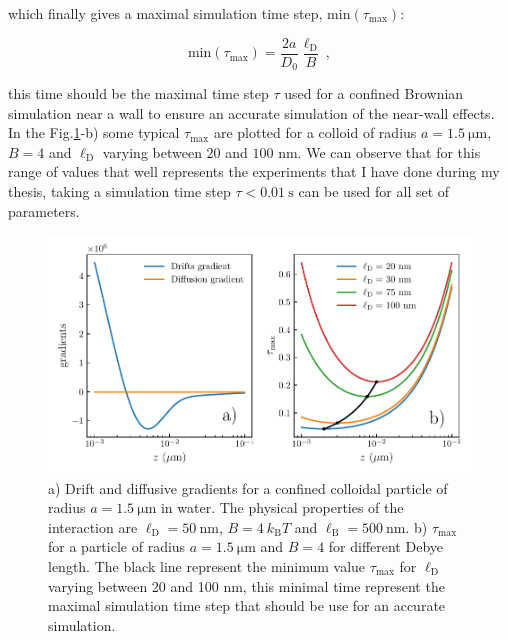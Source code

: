 which finally gives a maximal simulation time step, $\mathrm{min}(\tau_\mathrm{max})$:

\begin{equation}
	\mathrm{min}(\tau_\mathrm{max}) =  \frac{2 a}{D_0} \frac{\ell_\mathrm{D}}{B} ~,
\end{equation}

this time should be the maximal time step $\tau$ used for a confined Brownian simulation near a wall to ensure an accurate simulation of the near-wall effects. In the Fig.\ref{fig.taumax}-b) some typical $\tau_{\mathrm{max}}$ are plotted for a colloid of radius $a=1.5 ~\mathrm{\mu m}$, $B = 4$ and $\ell _\mathrm{D}$ varying between $20$ and $100$ nm. We can observe that for this range of values that well represents the experiments that I have done during my thesis, taking a simulation time step $\tau < 0.01 ~ \mathrm{s}$ can be used for all set of parameters.

\newpage

\begin{figure}[ht]
	\centering
	\includegraphics{02_body/chapter3/images/simulation_confined_Brownian_motion/maximal_tau.pdf}
	\caption{a) Drift and diffusive gradients for a confined colloidal particle of radius $a = 1.5 ~\mathrm{\mu m}$ in water. The physical properties of the interaction are $\ell_\mathrm{D} = 50 ~ \mathrm{nm}$, $B = 4 ~k_\mathrm{B}T$ and $\ell_\mathrm{B} = 500 ~ \mathrm{nm}$. b) $\tau_\mathrm{max}$ for a particle of radius $a = 1.5 ~\mathrm{\mu m}$ and $B = 4$ for different Debye length. The black line represent the minimum value $\tau_\mathrm{max}$ for $\ell_\mathrm{D}$ varying between 20 and 100 nm, this minimal time represent the maximal simulation time step that should be use for an accurate simulation.} 
	\label{fig.taumax}
\end{figure}

